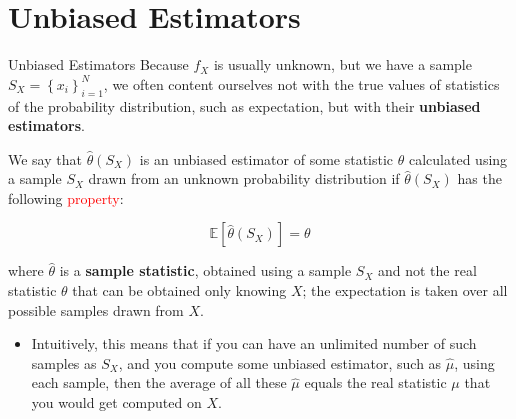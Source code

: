 \documentclass[9pt,dvipsnames]{beamer}
\begin{document}
\section{Unbiased Estimators}
\begin{frame}{Unbiased Estimators}
	Because $f_{X}$ is usually unknown, but we have a sample $S_{X}=\left\{x_{i}\right\}_{i=1}^{N}$, we often content ourselves not with the true values of statistics of the probability distribution, such as expectation, but with their \textbf{unbiased estimators}.

	We say that $\hat{\theta}\left(S_{X}\right)$ is an unbiased estimator of some statistic $\theta$ calculated using a sample $S_{X}$ drawn from an unknown probability distribution if $\hat{\theta}\left(S_{X}\right)$ has the following \textcolor{red}{property}:

	$$
		\mathbb{E}\left[\hat{\theta}\left(S_{X}\right)\right]=\theta
	$$

	where $\hat{\theta}$ is a \textbf{sample statistic}, obtained using a sample $S_{X}$ and not the real statistic $\theta$ that can be obtained only knowing $X$; the expectation is taken over all possible samples drawn from $X$.

	\begin{itemize}
		\item 	Intuitively, this means that if you can have an unlimited number of such samples as $S_{X}$, and you compute some unbiased estimator, such as $\hat{\mu}$, using each sample, then the average of all these $\hat{\mu}$ equals the real statistic $\mu$ that you would get computed on $X$.
	\end{itemize}

\end{frame}
\end{document}
